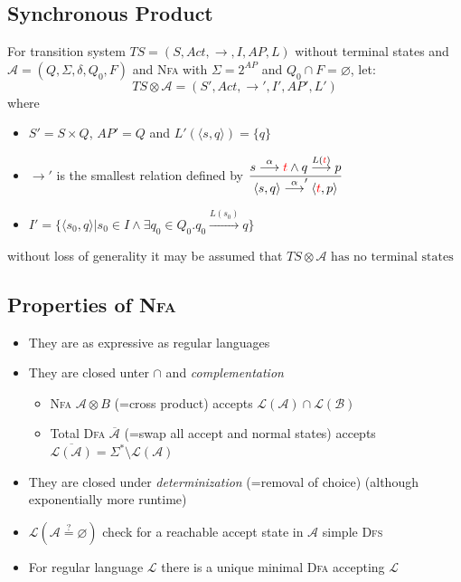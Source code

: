\documentclass[a4paper, 10pt]{article}
\begin{document}
\subsection*{Synchronous Product}
\begin{shaded}
\begin{multicols}{2}
For transition system $TS=(S,Act,\to,I,AP,L)$ without terminal states and $\mathcal{A}=(Q,\Sigma,\delta,Q_0,F)$ and \textsc{Nfa} with $\Sigma=2^{AP}$ and $Q_0\cap F=\varnothing$, let:
    \[ TS \otimes\mathcal{A}=(S',Act,\to',I',AP',L') \]
    where
    \begin{itemize}
        \item $S'=S\times Q$, $AP'=Q$ and $L'(\langle s,q \rangle) = \{ q \}$
        \item $\to'$ is the smallest relation defined by
        $\displaystyle \frac{
            s\overset{\alpha}{\longrightarrow}\textcolor{red}{t} \wedge q \overset{L(\textcolor{red}{t})}{\longrightarrow} p
        }{
        \langle s,q \rangle \overset{\alpha}{\longrightarrow}' \langle \textcolor{red}{t},p \rangle
        }$
        \item $I'=\{ \langle s_0,q \rangle | s_0\in I\wedge \exists q_0\in Q_0. q_0 \overset{L(s_0)}{\longrightarrow} q\}$
    \end{itemize}
    without loss of generality it may be assumed that $TS\otimes\mathcal{A}\textrm{ has no terminal states}$
\columnbreak
\begin{center}
\scalebox{0.5}{}
\end{center}
\end{multicols}
\end{shaded}

\subsection*{Properties of \textsc{Nfa}}
\begin{itemize}
    \item They are as expressive as regular languages
    \item They are closed unter $\cap$ and \emph{complementation}
    \begin{itemize}
        \item \textsc{Nfa} $\mathcal{A}\otimes B$ (=cross product) accepts $\mathcal{L}(\mathcal{A})\cap\mathcal{L}(\mathcal{B})$
        \item Total \textsc{Dfa} $\overline{\mathcal{A}}$ (=swap all accept and normal states) accepts $\overline{\mathcal{L}(\mathcal{A})}=\Sigma^*\setminus\mathcal{L}(\mathcal{A})$
    \end{itemize}
    \item They are closed under \emph{determinization} (=removal of choice) {\tiny (although exponentially more runtime)}
    \item $\mathcal{L}(\mathcal{A}\overset{?}{=}\varnothing)$ \follows \; check for a reachable accept state in $\mathcal{A}$ \follows \; simple \textsc{Dfs}
    \item For regular language $\mathcal{L}$ there is a unique minimal \textsc{Dfa} accepting $\mathcal{L}$
\end{itemize}
\end{document}
